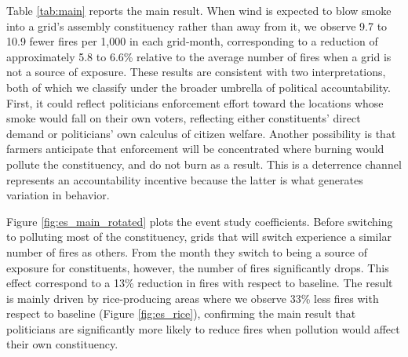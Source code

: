 \documentclass[12pt]{article}
\begin{document}
Table \ref{tab:main} reports the main result. When wind is expected to blow smoke into a grid's assembly constituency rather than away from it, we observe 9.7 to 10.9 fewer fires per 1,000 in each grid-month, corresponding to a reduction of approximately 5.8 to 6.6\% relative to the average number of fires when a grid is not a source of exposure. These results are consistent with two interpretations, both of which we classify under the broader umbrella of political accountability. First, it could reflect politicians enforcement effort toward the locations whose smoke would fall on their own voters, reflecting either constituents' direct demand or  politicians' own calculus of citizen welfare. Another possibility is that farmers anticipate that enforcement will be concentrated where burning would pollute the constituency, and do not burn as a result. This is a deterrence channel represents an accountability incentive because the latter is what generates variation in behavior.

Figure \ref{fig:es_main_rotated} plots the event study coefficients. Before switching to polluting most of the constituency, grids that will switch experience a similar number of fires as others. From the month they switch to being a source of exposure for constituents, however, the number of fires significantly drops. This effect correspond to a 13\% reduction in fires with respect to baseline. The result is mainly driven by rice-producing areas where we observe 33\% less fires with respect to baseline (Figure \ref{fig:es_rice}), confirming the main result that politicians are significantly more likely to reduce fires when pollution would affect their own constituency. 
\end{document}
